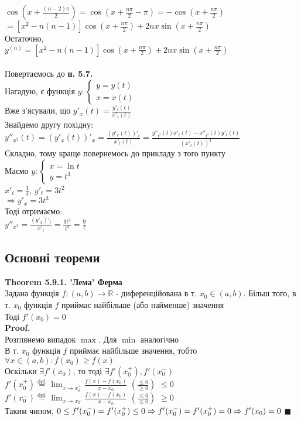 \documentclass[a4paper, 14pt]{extarticle}
\def\huge{\displaystyle}
\def\bigline{\vspace{5mm}\\}
\def\th#1{\textbf{Theorem {#1}}}
\def\proof{\textbf{Proof.}\\}
\def\bigline{\vspace{5mm}\\}
\def\qed{$\blacksquare$}
\begin{document}
$\huge \cos \left(x + \frac{(n-2)\pi}{2} \right) = \cos \left(x + \frac{n\pi}{2} - \pi \right) = - \cos \left(x + \frac{n\pi}{2} \right)$\\
$= \huge [x^2 - n(n-1)]\cos \left(x + \frac{n\pi}{2} \right) + 2nx \sin \left(x + \frac{n\pi}{2} \right)$\\
Остаточно,\\
$y^{(n)} = \huge [x^2 - n(n-1)]\cos \left(x + \frac{n\pi}{2} \right) + 2nx \sin \left(x + \frac{n\pi}{2} \right)$
\bigline
\bigline
Повертаємось до \textbf{п. 5.7.}\\
Нагадую, є функція $y: \begin{cases} y = y(t) \\ x = x(t) \end{cases}$\\
Вже з'ясували, що $\huge y'_x(t) = \frac{y'_t(t)}{x'_t(t)}$\\
Знайдемо другу похідну:\\
$\huge y''_{x^2}(t) = (y'_x(t))'_x = \frac{(y'_x(t))'_t}{x'_t(t)} = \frac{y''_{t^2}(t)x'_t(t)-x''_{t^2}(t)y'_t(t)}{(x'_t(t))^3}$
\bigline
Складно, тому краще повернемось до прикладу з того пункту\\
Маємо $y: \begin{cases} x = \ln t \\ y = t^3 \end{cases}$\\
$x'_t = \huge \frac{1}{t}$,    $y'_t = 3t^2$\\
$\Rightarrow y'_x = 3t^3$\\
Тоді отримаємо:\\
$y''_{x^2} = \huge \frac{(y'_x)'_t}{x'_t} = \frac{9t^2}{t^3} = \frac{9}{t}$
\bigline
\subsection{Основні теореми}
\th{5.9.1. 'Лема' Ферма}\\
Задана функція $f: (a,b) \to \mathbb{R}$ - диференційована в т. $x_0 \in (a,b)$. Більш того, в т. $x_0$ функція $f$ приймає найбільше (або найменше) значення\\
Тоді $f'(x_0)=0$\\
\proof
Розглянемо випадок $\max$. Для $\min$ аналогічно\\
В т. $x_0$ функція $f$ приймає найбільше значення, тобто \\ $\forall x \in (a,b): f(x_0) \geq f(x)$\\
Оскільки $\exists f'(x_0)$, то тоді $\exists f'(x_0^+), f'(x_0^-)$\\
$f'(x_0^+) \huge \overset{\textrm{def.}}{=} \lim_{x \to x_0^+} \frac{f(x)-f(x_0)}{x-x_0}$  $\left( \frac{\leq 0}{\geq 0} \right)$ $\leq 0$\\
$f'(x_0^-) \huge \overset{\textrm{def.}}{=} \lim_{x \to x_0^-} \frac{f(x)-f(x_0)}{x-x_0}$ $\left( \frac{\leq 0}{\leq 0} \right)$ $\geq 0$\\
Таким чином, $0 \leq f'(x_0^-) = f'(x_0^+) \leq 0 \Rightarrow f'(x_0^-) = f'(x_0^+) = 0\\ \Rightarrow f'(x_0) = 0$ \qed
\end{document}
